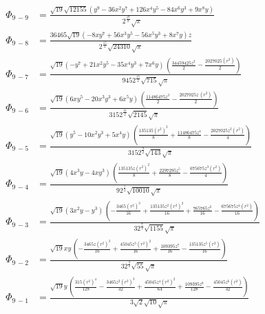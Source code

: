 \documentclass[10pt]{article}
\begin{document}
\begin{align*}
%
\Phi_{9\, -9} &= \frac{\sqrt{19} \sqrt{12155} \left( {{y}^{9}}-36 {{x}^{2}} {{y}^{7}}+126 {{x}^{4}} {{y}^{5}}-84 {{x}^{6}} {{y}^{3}}+9 {{x}^{8}} y\right) }{{{2}^{\frac{17}{2}}} \sqrt{\ensuremath{\pi} }} \\
\Phi_{9\, -8} &= \frac{36465 \sqrt{19} \left( -8 x {{y}^{7}}+56 {{x}^{3}} {{y}^{5}}-56 {{x}^{5}} {{y}^{3}}+8 {{x}^{7}} y\right)  z}{{{2}^{\frac{15}{2}}} \sqrt{24310} \sqrt{\ensuremath{\pi} }} \\
\Phi_{9\, -7} &= \frac{\sqrt{19} \left( -{{y}^{7}}+21 {{x}^{2}} {{y}^{5}}-35 {{x}^{4}} {{y}^{3}}+7 {{x}^{6}} y\right) \, \left( \frac{34459425 {{z}^{2}}}{2}-\frac{2027025 \left( r^2\right) }{2}\right) }{945 {{2}^{\frac{15}{2}}} \sqrt{715} \sqrt{\ensuremath{\pi} }} \\
\Phi_{9\, -6} &= \frac{\sqrt{19} \left( 6 x {{y}^{5}}-20 {{x}^{3}} {{y}^{3}}+6 {{x}^{5}} y\right) \, \left( \frac{11486475 {{z}^{3}}}{2}-\frac{2027025 z\, \left( r^2\right) }{2}\right) }{315 {{2}^{\frac{11}{2}}} \sqrt{2145} \sqrt{\ensuremath{\pi} }} \\
\Phi_{9\, -5} &= \frac{\sqrt{19} \left( {{y}^{5}}-10 {{x}^{2}} {{y}^{3}}+5 {{x}^{4}} y\right) \, \left( \frac{135135 {{\left( r^2\right) }^{2}}}{8}+\frac{11486475 {{z}^{4}}}{8}-\frac{2027025 {{z}^{2}} \left( r^2\right) }{4}\right) }{315 {{2}^{\frac{9}{2}}} \sqrt{143} \sqrt{\ensuremath{\pi} }} \\
\Phi_{9\, -4} &= \frac{\sqrt{19} \left( 4 {{x}^{3}} y-4 x {{y}^{3}}\right) \, \left( \frac{135135 z {{\left( r^2\right) }^{2}}}{8}+\frac{2297295 {{z}^{5}}}{8}-\frac{675675 {{z}^{3}} \left( r^2\right) }{4}\right) }{9 {{2}^{\frac{7}{2}}} \sqrt{10010} \sqrt{\ensuremath{\pi} }} \\
\Phi_{9\, -3} &= \frac{\sqrt{19} \left( 3 {{x}^{2}} y-{{y}^{3}}\right) \, \left( -\frac{3465 {{\left( r^2\right) }^{3}}}{16}+\frac{135135 {{z}^{2}} {{\left( r^2\right) }^{2}}}{16}+\frac{765765 {{z}^{6}}}{16}-\frac{675675 {{z}^{4}} \left( r^2\right) }{16}\right) }{3 {{2}^{\frac{7}{2}}} \sqrt{1155} \sqrt{\ensuremath{\pi} }} \\
\Phi_{9\, -2} &= \frac{\sqrt{19} x y\, \left( -\frac{3465 z {{\left( r^2\right) }^{3}}}{16}+\frac{45045 {{z}^{3}} {{\left( r^2\right) }^{2}}}{16}+\frac{109395 {{z}^{7}}}{16}-\frac{135135 {{z}^{5}} \left( r^2\right) }{16}\right) }{3 {{2}^{\frac{3}{2}}} \sqrt{55} \sqrt{\ensuremath{\pi} }} \\
\Phi_{9\, -1} &= \frac{\sqrt{19} y\, \left( \frac{315 {{\left( r^2\right) }^{4}}}{128}-\frac{3465 {{z}^{2}} {{\left( r^2\right) }^{3}}}{32}+\frac{45045 {{z}^{4}} {{\left( r^2\right) }^{2}}}{64}+\frac{109395 {{z}^{8}}}{128}-\frac{45045 {{z}^{6}} \left( r^2\right) }{32}\right) }{3 \sqrt{2} \sqrt{10} \sqrt{\ensuremath{\pi} }} \\

\end{align*}
\end{document}
